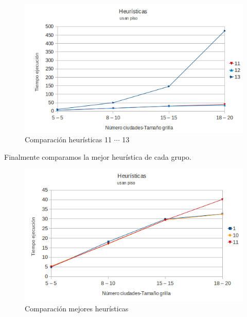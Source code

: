 \documentclass[10pt]{article}
\begin{document}
\begin{figure}[ht]
\begin{minipage}[b]{1\linewidth}
  \centering
 \includegraphics[scale=0.4]{heuristicas2.png}
 \caption{Comparación heurísticas  11 $\cdots$ 13}
 \label{fig:heu2}
\end{minipage}

\end{figure}

Finalmente comparamos la mejor heurística de cada grupo.

\begin{figure}[ht]
\begin{minipage}[b]{1\linewidth}
 \centering
 \includegraphics[scale=0.4]{heuristicas3.png}
 \caption{Comparación mejores heurísticas}
 \label{fig:heu3}
 \end{minipage}
\end{figure}

\newpage
\end{document}

